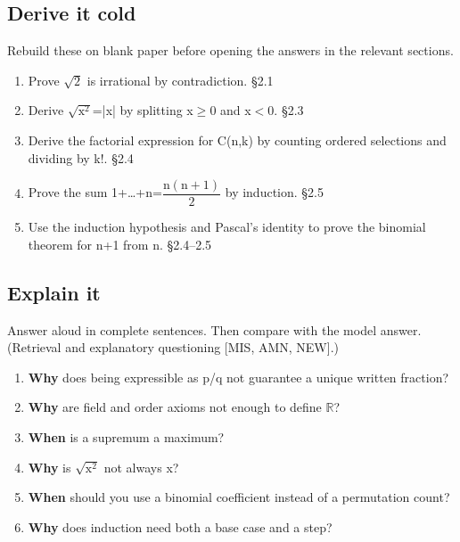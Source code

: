 \documentclass[11pt]{article}
\begin{document}
\begin{keepsection}
\section{Derive it cold}

Rebuild these on blank paper before opening the answers in the relevant sections.

\begin{enumerate}
\item Prove \ensuremath{\sqrt{2}} is irrational by contradiction. \hfill{\small\color{FAUblue}§2.1}
\item Derive \ensuremath{\sqrt{\mathrm{x}^{2}}}=|x| by splitting x\ensuremath{\geq}0 and x\ensuremath{<}0. \hfill{\small\color{FAUblue}§2.3}
\item Derive the factorial expression for C(n,k) by counting ordered selections and dividing by k!. \hfill{\small\color{FAUblue}§2.4}
\item Prove the sum 1+…+n={\small\ensuremath{\dfrac{\mathrm{n}(\mathrm{n}+1)}{2}}} by induction. \hfill{\small\color{FAUblue}§2.5}
\item Use the induction hypothesis and Pascal’s identity to prove the binomial theorem for n+1 from n. \hfill{\small\color{FAUblue}§2.4–2.5}
\end{enumerate}
\end{keepsection}

\begin{keepsection}
\section{Explain it}

Answer aloud in complete sentences. Then compare with the model answer. (Retrieval and explanatory questioning [MIS, AMN, NEW].)

\begin{enumerate}
\item \textbf{Why} does being expressible as p/q not guarantee a unique written fraction?
\item \textbf{Why} are field and order axioms not enough to define \ensuremath{\mathbb{R}}?
\item \textbf{When} is a supremum a maximum?
\item \textbf{Why} is \ensuremath{\sqrt{\mathrm{x}^{2}}} not always x?
\item \textbf{When} should you use a binomial coefficient instead of a permutation count?
\item \textbf{Why} does induction need both a base case and a step?
\end{enumerate}

\end{keepsection}
\end{document}
